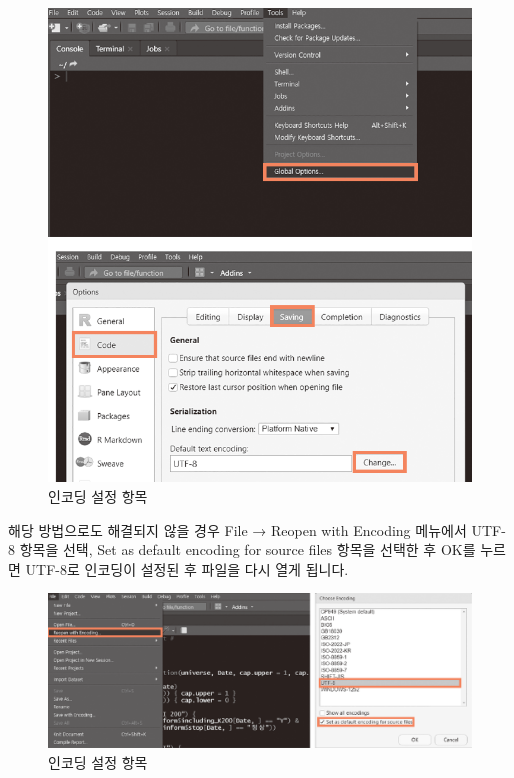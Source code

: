 \documentclass[]{book}
\begin{document}
\begin{figure}

{\centering \includegraphics[width=1\linewidth]{images/utf_encoding_1} 

}

\caption{인코딩 설정 항목}\label{fig:unnamed-chunk-3}
\end{figure}

해당 방법으로도 해결되지 않을 경우 File → Reopen with Encoding 메뉴에서 UTF-8 항목을 선택, Set as default encoding for source files 항목을 선택한 후 OK를 누르면 UTF-8로 인코딩이 설정된 후 파일을 다시 열게 됩니다.

\begin{figure}

{\centering \includegraphics[width=1\linewidth]{images/utf_encoding_2} 

}

\caption{인코딩 설정 항목}\label{fig:unnamed-chunk-4}
\end{figure}
\end{document}
